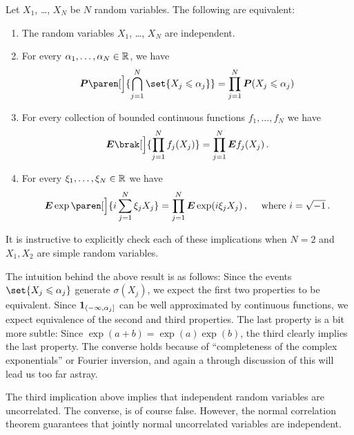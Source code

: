 \begin{proposition}
  Let $X_1$, \dots, $X_N$ be $N$ random variables.
  The following are equivalent:
  \begin{enumerate}
    \item The random variables $X_1$, \dots, $X_N$ are independent.
    \item For every $\alpha_1, \dots, \alpha_N \in \mathbb{R}$, we have
      \begin{equation*}
	\P\paren[\Big]{
	  \bigcap_{j=1}^N \set{X_j \leq \alpha_j}
	}
	= \prod_{j=1}^N \P(X_j \leq \alpha_j)
      \end{equation*}
    \item For every collection of bounded continuous functions $f_1, \dots, f_N$ we have
      \begin{equation*}
	\E \brak[\Big]{ \prod_{j = 1}^N f_j(X_j) } = \prod_{j=1}^N \E f_j(X_j) \,.
      \end{equation*}

    \item
      For every $\xi_1, \dots, \xi_N \in \mathbb{R}$ we have
      \begin{equation*}
	\E \exp\paren[\Big]{ i\sum_{j=1}^{N} \xi_j X_j }
	= \prod_{j=1}^{N} \E \exp( i \xi_j X_j )\,,
	\quad\text{ where } i = \sqrt{-1}\,.
      \end{equation*}
  \end{enumerate}
\end{proposition}

\begin{remark}
  It is instructive to explicitly check each of these implications when $N = 2$ and $X_1, X_2$ are simple random variables.
\end{remark}

\begin{remark}
  The intuition behind the above result is as follows:
  Since the events $\set{X_j \leq \alpha_j}$ generate $\sigma(X_j)$, we expect the first two properties to be equivalent.
  Since $\bm{1}_{(-\infty, \alpha_j]}$ can be well approximated by continuous functions, we expect equivalence of the second and third properties.
  The last property is a bit more subtle: Since $\exp(a + b) = \exp(a) \exp(b)$, the third clearly implies the last property.
  The converse holds because of ``completeness of the complex exponentials'' or Fourier inversion, and again a through discussion of this will lead us too far astray.
\end{remark}

\begin{remark}
  The third implication above implies that independent random variables are uncorrelated. The converse, is of course false.
  However, the normal correlation theorem guarantees that jointly normal uncorrelated variables are independent.
\end{remark}


